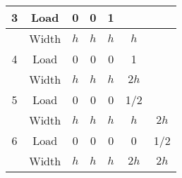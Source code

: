\documentclass[review,12pt]{elsarticle}
\begin{document}
\begin{table}[htb!]
\begin{tabular}{|ccccccc|}
\multicolumn{1}{|c|}{\multirow{-2}{*}{3}} & \multicolumn{1}{c|}{Load}  & \multicolumn{1}{c|}{0}   & \multicolumn{1}{c|}{0}                        & \multicolumn{1}{c|}{1}                        & \multicolumn{1}{c|}{\cellcolor[HTML]{9B9B9B}}                        & \cellcolor[HTML]{9B9B9B}                        \\ \hline \hline
\multicolumn{1}{|c|}{}                    & \multicolumn{1}{c|}{Width} & \multicolumn{1}{c|}{$h$} & \multicolumn{1}{c|}{$h$}                      & \multicolumn{1}{c|}{$h$}                      & \multicolumn{1}{c|}{$h$}                                             & \cellcolor[HTML]{9B9B9B}{\color[HTML]{9B9B9B} } \\ \cline{2-7}
\multicolumn{1}{|c|}{\multirow{-2}{*}{4}} & \multicolumn{1}{c|}{Load}  & \multicolumn{1}{c|}{0}   & \multicolumn{1}{c|}{0}                        & \multicolumn{1}{c|}{0}                        & \multicolumn{1}{c|}{1}                                               & \cellcolor[HTML]{9B9B9B}                        \\ \hline \hline
\multicolumn{1}{|c|}{}                    & \multicolumn{1}{c|}{Width} & \multicolumn{1}{c|}{$h$} & \multicolumn{1}{c|}{$h$}                      & \multicolumn{1}{c|}{$h$}                      & \multicolumn{1}{c|}{$2h$}                                            & \cellcolor[HTML]{9B9B9B}                        \\ \cline{2-7}
\multicolumn{1}{|c|}{\multirow{-2}{*}{5}} & \multicolumn{1}{c|}{Load}  & \multicolumn{1}{c|}{0}   & \multicolumn{1}{c|}{0}                        & \multicolumn{1}{c|}{0}                        & \multicolumn{1}{c|}{1/2}                                             & \cellcolor[HTML]{9B9B9B}                        \\ \hline \hline
\multicolumn{1}{|c|}{}                    & \multicolumn{1}{c|}{Width} & \multicolumn{1}{c|}{$h$} & \multicolumn{1}{c|}{$h$}                      & \multicolumn{1}{c|}{$h$}                      & \multicolumn{1}{c|}{$h$}                                             & $2h$                                            \\ \cline{2-7}
\multicolumn{1}{|c|}{\multirow{-2}{*}{6}} & \multicolumn{1}{c|}{Load}  & \multicolumn{1}{c|}{0}   & \multicolumn{1}{c|}{0}                        & \multicolumn{1}{c|}{0}                        & \multicolumn{1}{c|}{0}                                               & 1/2                                             \\ \hline \hline
\multicolumn{1}{|c|}{}                    & \multicolumn{1}{c|}{Width} & \multicolumn{1}{c|}{$h$} & \multicolumn{1}{c|}{$h$}                      & \multicolumn{1}{c|}{$h$}                      & \multicolumn{1}{c|}{$2h$}                                            & $2h$                                            \\ \cline{2-7}

\end{tabular}
\end{table}
\end{document}
